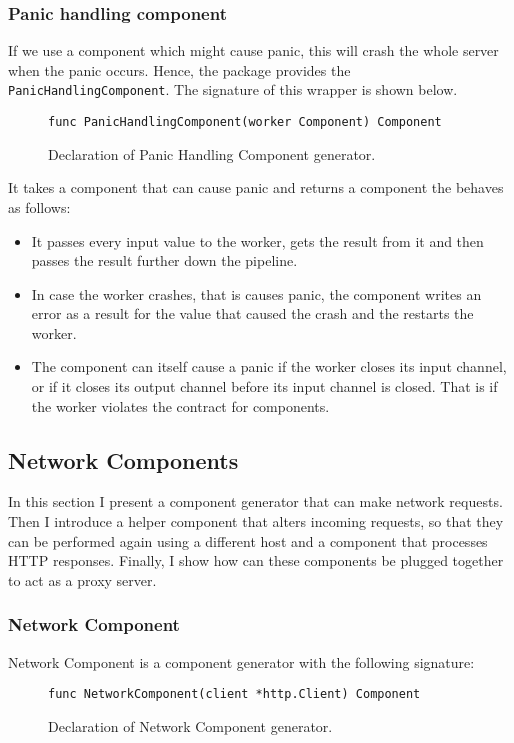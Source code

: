 \documentclass[12pt,a4paper]{article}
\begin{document}
\subsubsection{Panic handling component}
If we use a component which might cause panic, this will crash the whole
server when the panic occurs. Hence, the package provides the 
\texttt{PanicHandlingComponent}. The signature of this wrapper is shown 
below.
\begin{figure}[h]
\centering
\begin{lstlisting}
func PanicHandlingComponent(worker Component) Component
\end{lstlisting}
\caption[scale=1.0]{Declaration of Panic Handling Component generator.}
\label{fig:panicHandler}
\end{figure}

It takes a component that can cause panic and returns a component the 
behaves as follows:
\begin{itemize}
	\item It passes every input value to the worker, gets the result 
          from it and then passes the result further down the pipeline.
	\item In case the worker crashes, that is causes panic, the component 
          writes an error as a result for the value that caused the crash 
          and the restarts the worker.
	\item The component can itself cause a panic if the worker closes its 
          input channel, or if it closes its output channel before its input 
          channel is closed. That is if the worker violates the contract
          for components.
\end{itemize}

\subsection{Network Components}
In this section I present a component generator that can make network
requests. Then I introduce a helper component that alters incoming 
requests, so that they can be performed again using a different host
and a component that processes HTTP responses. Finally, I show how
can these components be plugged together to act as a proxy server. 

\subsubsection{Network Component}
Network Component is a component generator with the following signature:
\begin{figure}[h]
\centering
\begin{lstlisting}
func NetworkComponent(client *http.Client) Component
\end{lstlisting}
\caption[scale=1.0]{Declaration of Network Component generator.}
\label{fig:NetworkComponent}
\end{figure}
\end{document}

